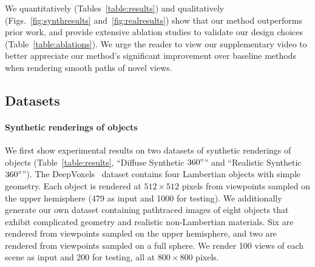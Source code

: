 \documentclass[runningheads]{llncs}
\begin{document}
We quantitatively (Tables~\ref{table:results}) and qualitatively (Figs.~\ref{fig:synthresults} and~\ref{fig:realresults}) show that our method outperforms prior work, and provide extensive ablation studies to validate our design choices (Table~\ref{table:ablations}). We urge the reader to view our supplementary video to better appreciate our method's significant improvement over baseline methods when rendering smooth paths of novel views.

\subsection{Datasets}

\paragraph{\textbf{Synthetic renderings of objects}}
\label{subsec:goodsynth}

We first show experimental results on two datasets of synthetic renderings of objects (Table~\ref{table:results}, ``Diffuse Synthetic $360\degree$'' and ``Realistic Synthetic $360\degree$''). The DeepVoxels~\cite{deepvoxels} dataset contains four Lambertian objects with simple geometry. Each object is rendered at $512\times 512$ pixels from viewpoints sampled on the upper hemisphere (479 as input and 1000 for testing). We additionally generate our own dataset containing pathtraced images of eight objects that exhibit complicated geometry and realistic non-Lambertian materials. Six are rendered from viewpoints sampled on the upper hemisphere, and two are rendered from viewpoints sampled on a full sphere. We render 100 views of each scene as input and 200 for testing, all at $800\times 800$ pixels.





\newcommand{\resultsfigwidth}{1.14in}
\renewcommand{\resultscropwidth}{0.69in}

\newcommand{\cropship}[1]{
  \makecell{
\texttt{[image: \#1]} \\
  \texttt{[image: \#1]}
  }
}


\newcommand{\croplego}[1]{
  \makecell{
\texttt{[image: \#1]} \\
  \texttt{[image: \#1]}
  }
}
\end{document}
